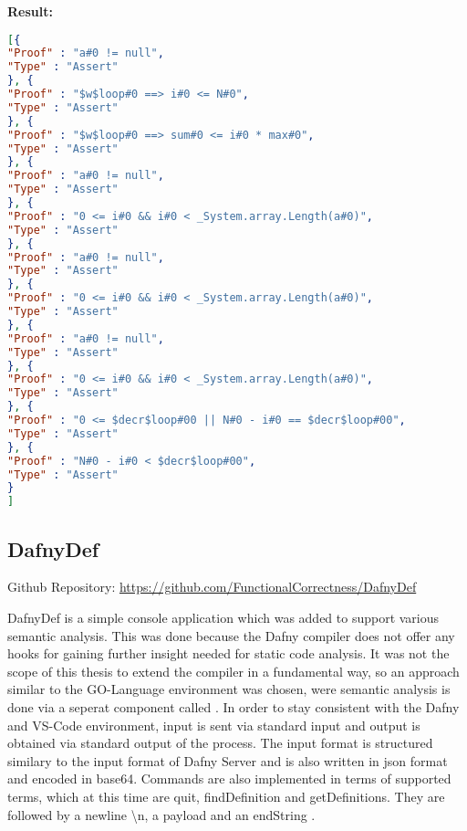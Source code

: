 \textbf{Result: }
\begin{lstlisting}[language=json,firstnumber=1]
[{
"Proof" : "a#0 != null",
"Type" : "Assert"
}, {
"Proof" : "$w$loop#0 ==> i#0 <= N#0",
"Type" : "Assert"
}, {
"Proof" : "$w$loop#0 ==> sum#0 <= i#0 * max#0",
"Type" : "Assert"
}, {
"Proof" : "a#0 != null",
"Type" : "Assert"
}, {
"Proof" : "0 <= i#0 && i#0 < _System.array.Length(a#0)",
"Type" : "Assert"
}, {
"Proof" : "a#0 != null",
"Type" : "Assert"
}, {
"Proof" : "0 <= i#0 && i#0 < _System.array.Length(a#0)",
"Type" : "Assert"
}, {
"Proof" : "a#0 != null",
"Type" : "Assert"
}, {
"Proof" : "0 <= i#0 && i#0 < _System.array.Length(a#0)",
"Type" : "Assert"
}, {
"Proof" : "0 <= $decr$loop#00 || N#0 - i#0 == $decr$loop#00",
"Type" : "Assert"
}, {
"Proof" : "N#0 - i#0 < $decr$loop#00",
"Type" : "Assert"
}
]
\end{lstlisting}




\subsection{DafnyDef}
Github Repository: \href{https://github.com/FunctionalCorrectness/DafnyDef}{https://github.com/FunctionalCorrectness/DafnyDef}

DafnyDef is a simple console application which was added to support various semantic analysis. This was done because the Dafny compiler does not offer any hooks for gaining further insight needed for static code analysis. It was not the scope of this thesis to extend the compiler in a fundamental way, so an approach similar to the GO-Language environment was chosen, were semantic analysis is done via a seperat component called \cite{godef}. \newline
In order to stay consistent with the Dafny and VS-Code environment, input is sent via standard input and output is obtained via standard output of the process. The input format is structured similary to the input format of Dafny Server and is also written in json format and encoded in base64. Commands are also implemented in terms of supported terms, which at this time are quit, findDefinition and getDefinitions. They are followed by a newline \textbackslash{n}, a payload and an endString . \newline




